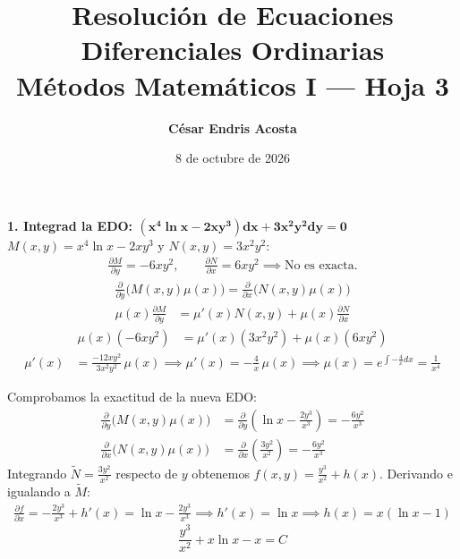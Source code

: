 \documentclass[11pt, a4paper]{article}
\title{\vspace{-1.5cm}\textbf{Resolución de Ecuaciones Diferenciales Ordinarias}\\ \large Métodos Matemáticos I --- Hoja 3}
\author{\textbf{César Endris Acosta}}
\date{8 de octubre de 2026}
\begin{document}
\maketitle
\vspace{-0.2cm}

\begin{center}
\end{center}

\noindent\textbf{1. Integrad la EDO: $\bm{(x^4\ln x - 2xy^3)dx + 3x^2y^2dy = 0}$} \\
$M(x,y) = x^4\ln x - 2xy^3$ y $N(x,y) = 3x^2y^2$:
\begin{align*}
\frac{\partial M}{\partial y} = -6xy^2, \qquad \frac{\partial N}{\partial x} = 6xy^2 \implies \text{No es exacta.}
\end{align*}
\begin{align*}
\frac{\partial}{\partial y}\big(M(x,y)\mu(x)\big) = \frac{\partial}{\partial x}\big(N(x,y)\mu(x)\big)
\end{align*}
\begin{align*}
\mu(x)\frac{\partial M}{\partial y} &= \mu'(x)N(x,y) + \mu(x)\frac{\partial N}{\partial x}
\end{align*}
\begin{align*}
\mu(x)(-6xy^2) &= \mu'(x)(3x^2y^2) + \mu(x)(6xy^2)
\end{align*}
\begin{align*}
\mu'(x) &= \frac{-12xy^2}{3x^2y^2} \, \mu(x) \implies \mu'(x) = -\frac{4}{x} \, \mu(x)\implies \mu(x) = e^{\int -\frac{4}{x}dx} = \frac{1}{x^4}
\end{align*}

Comprobamos la exactitud de la nueva EDO:
\begin{align*}
\frac{\partial}{\partial y}\big(M(x,y)\mu(x)\big) &= \frac{\partial}{\partial y}\left(\ln x - \frac{2y^3}{x^3}\right) = -\frac{6y^2}{x^3} \\
\frac{\partial}{\partial x}\big(N(x,y)\mu(x)\big) &= \frac{\partial}{\partial x}\left(\frac{3y^2}{x^2}\right) = -\frac{6y^2}{x^3}
\end{align*}
Integrando $\tilde{N} = \frac{3y^2}{x^2}$ respecto de $y$ obtenemos $f(x,y) = \frac{y^3}{x^2} + h(x)$. Derivando e igualando a $\tilde{M}$:
\begin{align*}
\frac{\partial f}{\partial x} = -\frac{2y^3}{x^3} + h'(x) = \ln x - \frac{2y^3}{x^3} \implies h'(x) = \ln x \implies h(x) = x(\ln x - 1)
\end{align*}
\[
\boxed{\frac{y^3}{x^2} + x\ln x - x = C}
\]
\end{document}

